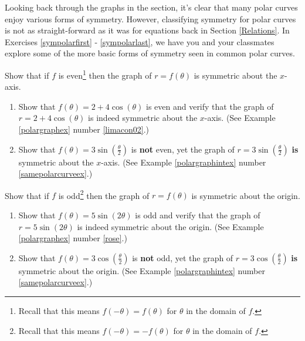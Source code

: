 \documentclass{ximera}
\begin{document}
\begin{question} 
Looking back through the graphs in the section, it's clear that many polar curves enjoy various forms of symmetry.  However, classifying symmetry for polar curves is not as straight-forward as it was for equations back in Section \ref{Relations}.  In Exercises \ref{sympolarfirst} - \ref{sympolarlast}, we have you and your classmates explore some of the more basic forms of symmetry seen in common polar curves.
\label{polarsymmetry} 


\begin{problem}  \label{sympolarfirst}
Show that if $f$ is even\footnote{Recall that this means $f(-\theta) = f(\theta)$ for $\theta$ in the domain of $f$.} then the graph of $r = f(\theta)$ is symmetric about the $x$-axis.


\begin{enumerate}

\item Show that $f(\theta) = 2 + 4\cos(\theta)$ is even and verify that the graph of  $r = 2+4\cos(\theta)$ is indeed symmetric about the $x$-axis.  (See Example \ref{polargraphex} number \ref{limacon02}.)

\item Show that $f(\theta) = 3\sin\left(\frac{\theta}{2}\right)$ is \textbf{not} even, yet the graph of $r = 3\sin\left(\frac{\theta}{2}\right)$ \textbf{is} symmetric about the $x$-axis.  (See  Example \ref{polargraphintex} number \ref{samepolarcurveex}.) 

\end{enumerate}

\end{problem}

\begin{problem}

Show that if $f$ is odd\footnote{Recall that this means $f(-\theta) = -f(\theta)$ for $\theta$ in the domain of $f$.} then the graph of $r = f(\theta)$ is symmetric about the origin.

\begin{enumerate}

\item  Show that $f(\theta) = 5\sin(2\theta)$ is odd and verify that the graph of $r = 5\sin(2\theta)$ is indeed symmetric about the origin.  (See Example \ref{polargraphex} number \ref{rose}.)

\item  Show that $f(\theta) = 3\cos\left(\frac{\theta}{2}\right)$ is \textbf{not} odd, yet the graph of $r = 3\cos\left(\frac{\theta}{2}\right)$ \textbf{is} symmetric about the origin.  (See  Example \ref{polargraphintex} number \ref{samepolarcurveex}.)


\end{enumerate}
\end{problem}
\end{question}
\end{document}
